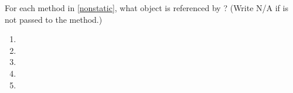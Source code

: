 \Q For each method in \ref{nonstatic}, what object is referenced by ?
(Write N/A if  is not passed to the method.)

\begin{multicols}{2}
\begin{enumerate}

\item {}

\item {}

\item {}

\item {}

\item {}

\end{enumerate}
\end{multicols}
